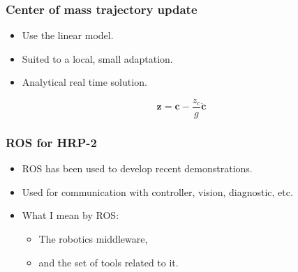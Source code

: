 \documentclass[14pt,utf8,hyperref={pdfpagelabels=false}]{beamer}
\begin{document}
\begin{slideAction}
  \frametitle{Center of mass trajectory update}

  \begin{changeleftmargin}{1.1cm}
    \begin{itemize}
    \item Use the linear model.
    \item Suited to a local, small adaptation.
    \item Analytical real time solution.
    \end{itemize}

    \begin{equation*}
      \mathbf{z} = \mathbf{c} - \frac{z_c}{g} \ddot{\mathbf{c}}
    \end{equation*}

  \end{changeleftmargin}
\end{slideAction}



\begin{slideDecision}
  \frametitle{ROS for HRP-2}

  \begin{changemargin}{-1cm}{-1cm}
  \begin{itemize}
  \item ROS has been used to develop recent demonstrations.
  \item Used for communication with controller, vision, diagnostic, etc.
  \item What I mean by ROS:
    \begin{itemize}
    \item The robotics middleware,
    \item and the set of tools related to it.
    \end{itemize}
  \end{itemize}
  \end{changemargin}
\end{slideDecision}

\end{document}

